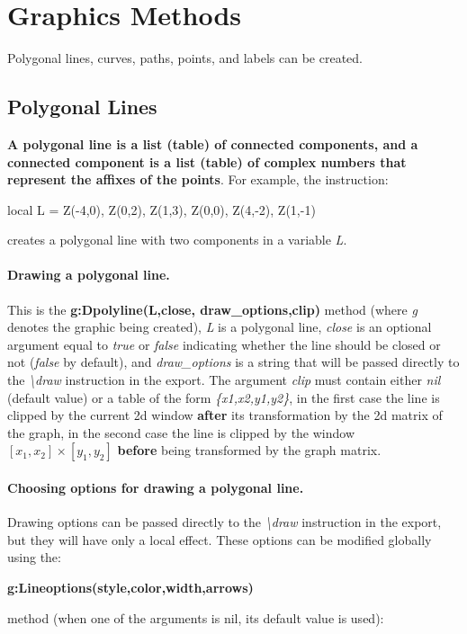 \section{Graphics Methods}

Polygonal lines, curves, paths, points, and labels can be created.

\subsection{Polygonal Lines}

\textbf{A polygonal line is a list (table) of connected components, and a connected component is a list (table) of complex numbers that represent the affixes of the points}. For example, the instruction:
\begin{Luacode}
local L = { {Z(-4,0), Z(0,2), Z(1,3)}, {Z(0,0), Z(4,-2), Z(1,-1)} }
\end{Luacode}
creates a polygonal line with two components in a variable \emph{L}.

\paragraph{Drawing a polygonal line.}

This is the \textbf{g:Dpolyline(L,close, draw\_options,clip)} method (where \emph{g} denotes the graphic being created), \emph{L} is a polygonal line, \emph{close} is an optional argument equal to \emph{true} or \emph{false} indicating whether the line should be closed or not (\emph{false} by default), and \emph{draw\_options} is a string that will be passed directly to the \emph{\textbackslash draw} instruction in the export. The argument \emph{clip} must contain either \emph{nil} (default value) or a table of the form \emph{\{x1,x2,y1,y2\}}, in the first case the line is clipped by the current 2d window \textbf{after} its transformation by the 2d matrix of the graph, in the second case the line is clipped by the window $[x_1,x_2]\times[y_1,y_2]$ \textbf{before} being transformed by the graph matrix.


\paragraph{Choosing options for drawing a polygonal line.}

Drawing options can be passed directly to the \emph{\textbackslash draw} instruction in the export, but they will have only a local effect. These options can be modified globally using the:
\par\hfil\textbf{g:Lineoptions(style,color,width,arrows)}\hfil\par
 method (when one of the arguments is nil, its default value is used):

